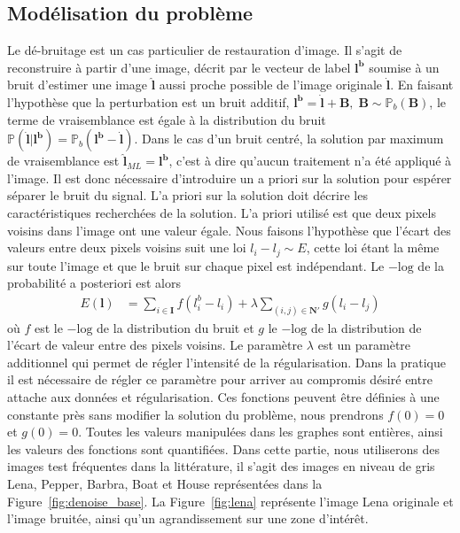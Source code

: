 \documentclass[../main/These_Mathias_Paget.tex]{subfiles}
\begin{document}
\subsection{Modélisation du problème}
	Le dé-bruitage est un cas particulier de restauration d'image. Il s'agit de reconstruire à partir d'une image, décrit par le vecteur de label $\boldsymbol{l^b}$ soumise à un bruit d'estimer une image $\boldsymbol{\hat{l}}$ aussi proche possible de l'image originale $\boldsymbol{\dot{l}}$. En faisant l'hypothèse que la perturbation est un bruit additif,  $\boldsymbol{l^b} = \boldsymbol{\dot{l}} {+}  \boldsymbol{B}, \;
 \boldsymbol{B} \sim \mathbb{P}_b(\boldsymbol{B})$, le terme de vraisemblance est égale à la distribution du bruit $\mathbb{P}(\boldsymbol{\dot{l}} | \boldsymbol{l^b}) = \mathbb{P}_b(\boldsymbol{l^b}  {-} \boldsymbol{\dot{l}})$. Dans le cas d'un bruit centré, la solution par maximum de vraisemblance est $\boldsymbol{\hat{l}}_{ML} = \boldsymbol{l^b}$, c'est à dire qu'aucun traitement n'a été appliqué à l'image. Il est donc nécessaire d'introduire un a priori sur la solution pour espérer séparer le bruit du signal. L'a priori sur la solution doit décrire les caractéristiques recherchées de la solution. L'a priori utilisé est que deux pixels voisins dans l'image ont une valeur égale. Nous faisons l'hypothèse que l'écart des valeurs entre deux pixels voisins suit une loi $l_i-l_j \sim E $, cette loi étant la même sur toute l'image et que le bruit sur chaque pixel est indépendant. Le $-\text{log}$ de la probabilité a posteriori est alors
\begin{equation}
\begin{aligned}
E(\boldsymbol{l}) &= \sum_{i \in \boldsymbol{I}}{ f(l^b_i - l_i)} + 
\lambda \sum_{(i,j) \in \boldsymbol{N'}}{ g(l_i-l_j) }
\end{aligned}
\end{equation} 
où $f$ est le $-\text{log}$ de la distribution du bruit et $g$ le $-\text{log}$ de la distribution de l’écart de valeur entre des pixels voisins. Le paramètre $\lambda$ est un paramètre additionnel qui permet de régler l'intensité de la régularisation. Dans la pratique il est nécessaire de régler ce paramètre pour arriver au compromis désiré entre attache aux données et régularisation. Ces fonctions peuvent être définies à une constante près sans modifier la solution du problème, nous prendrons $f(0)=0$ et $g(0)=0$. Toutes les valeurs manipulées dans les graphes sont entières, ainsi les valeurs des fonctions sont quantifiées. Dans cette partie, nous utiliserons des images test fréquentes dans la littérature, il s'agit des images en niveau de gris Lena, Pepper, Barbra, Boat et House représentées dans la Figure~\ref{fig:denoise_base}. La Figure~\ref{fig:lena} représente l'image Lena originale et l'image bruitée, ainsi qu'un agrandissement sur une zone d'intérêt.
\end{document}
